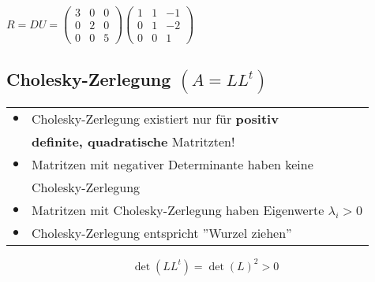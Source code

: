 			\vspace{0.3cm}
			
			$R = DU = \begin{pmatrix} 3 & 0 & 0 \\ 0 & 2 & 0 \\ 0 & 0 & 5  \end{pmatrix}  \begin{pmatrix} 1 & 1 & -1 \\ 0 & 1 & -2 \\ 0 & 0 & 1  \end{pmatrix}$
			
			
			
			
			
			
			
			\subsection{Cholesky-Zerlegung $(A = L L^t)$}
			\begin{tabular}{ll}
			$\bullet$ & Cholesky-Zerlegung existiert nur für \textbf{positiv} \\
			& \textbf{definite, quadratische} Matritzten! \\
			$\bullet$ & Matritzen mit negativer Determinante haben keine\\ 
			& Cholesky-Zerlegung \\
			$\bullet$ & Matritzen mit Cholesky-Zerlegung haben Eigenwerte $\lambda_i > 0$ \\
			$\bullet$ & Cholesky-Zerlegung entspricht ''Wurzel ziehen'' \\
			\end{tabular}
			
			$$\det(L L^t) = \det(L)^2 > 0 $$ 
			
